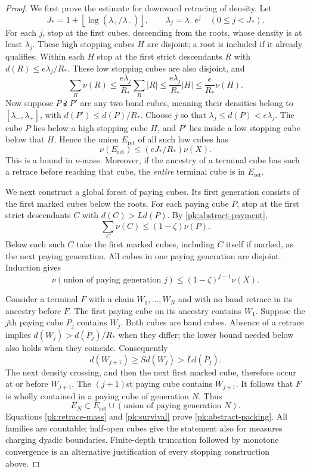 \begin{proof}
We first prove the estimate for downward retracing of density.
Let
\[
 J_*=1+\left\lfloor\log(\lambda_+/\lambda_-)\right\rfloor,
 \qquad \lambda_j=\lambda_-e^j\quad(0\le j<J_*).
\]
For each $j$, stop at the first cubes, descending from the
roots, whose density is at least $\lambda_j$.  These high
stopping cubes $H$ are disjoint; a root is included if it
already qualifies.  Within each $H$ stop at the first strict
descendants $R$ with
$d(R)\le e\lambda_j/R_*$.  These low stopping cubes are
also disjoint, and
\[
 \sum_R\nu(R)
 \le \frac{e\lambda_j}{R_*}\sum_R|R|
 \le\frac{e\lambda_j}{R_*}|H|
 \le\frac e{R_*}\nu(H).
\]
Now suppose $P\supsetneqq P'$ are any two band cubes, meaning
their densities belong to $[\lambda_-,\lambda_+]$, with
$d(P')\le d(P)/R_*$.  Choose $j$ so that
$\lambda_j\le d(P)<e\lambda_j$.  The cube $P$ lies below
a high stopping cube $H$, and $P'$ lies inside a low stopping
cube below that $H$.  Hence the union $E_{\mathrm{ret}}$ of
all such low cubes has
\begin{equation}\label{pk:retrace-mass}
 \nu(E_{\mathrm{ret}})\le(eJ_*/R_*)\nu(X).
\end{equation}
This is a bound in $\nu$-mass.  Moreover, if the ancestry of
a terminal cube has such a retrace before reaching that cube,
the \emph{entire} terminal cube is in $E_{\mathrm{ret}}$.

We next construct a global forest of paying cubes.  Its first
generation consists of the first marked cubes below the roots.
For each paying cube $P$, stop at the first strict descendants
$C$ with $d(C)>Ld(P)$.  By \eqref{pk:abstract-payment},
\[
 \sum_C\nu(C)\le(1-\zeta)\nu(P).
\]
Below each such $C$ take the first marked cubes, including
$C$ itself if marked, as the next paying generation.  All cubes
in one paying generation are disjoint.  Induction gives
\begin{equation}\label{pk:survival}
 \nu(\text{union of paying generation }j)
 \le(1-\zeta)^{j-1}\nu(X).
\end{equation}

Consider a terminal $F$ with a chain $W_1,\ldots,W_N$ and
with no band retrace in its ancestry before $F$.  The first
paying cube on its ancestry contains $W_1$.  Suppose the
$j$th paying cube $P_j$ contains $W_j$.  Both cubes are band
cubes.  Absence of a retrace implies
$d(W_j)>d(P_j)/R_*$ when they differ; the lower bound needed
below also holds when they coincide.  Consequently
\[
 d(W_{j+1})\ge S d(W_j)>L d(P_j).
\]
The next density crossing, and then the next first marked cube,
therefore occur at or before $W_{j+1}$.  The $(j+1)$st paying
cube contains $W_{j+1}$.  It follows that $F$ is wholly contained
in a paying cube of generation $N$.  Thus
\[
 E_N\subset E_{\mathrm{ret}}
       \cup(\text{union of paying generation }N).
\]
Equations \eqref{pk:retrace-mass} and \eqref{pk:survival}
prove \eqref{pk:abstract-packing}.  All families are countable;
half-open cubes give the statement also for measures charging
dyadic boundaries.  Finite-depth truncation followed by
monotone convergence is an alternative justification of every
stopping construction above.


\end{proof}
